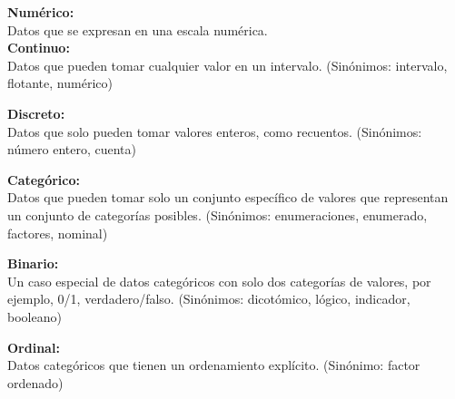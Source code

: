 \documentclass[ebook,12pt,oneside,openany]{memoir}
\begin{document}
\setlength{\parindent}{0pt}\textbf{Numérico:}\\
Datos que se expresan en una escala numérica.\\
\setlength{\parindent}{0pt}\textbf{Continuo:}\\
Datos que pueden tomar cualquier valor en un intervalo. (Sinónimos: intervalo, flotante, numérico)

\setlength{\parindent}{0pt}\textbf{Discreto:}\\
Datos que solo pueden tomar valores enteros, como recuentos. (Sinónimos: número entero, cuenta)

\setlength{\parindent}{0pt}\textbf{Categórico:}\\
Datos que pueden tomar solo un conjunto específico de valores que representan un conjunto de categorías posibles. (Sinónimos: enumeraciones, enumerado, factores, nominal)

\setlength{\parindent}{0pt}\textbf{Binario:}\\
Un caso especial de datos categóricos con solo dos categorías de valores, por ejemplo, 0/1, verdadero/falso. (Sinónimos: dicotómico, lógico, indicador, booleano)

\setlength{\parindent}{0pt}\textbf{Ordinal:}\\
Datos categóricos que tienen un ordenamiento explícito. (Sinónimo: factor ordenado)
\end{document}
